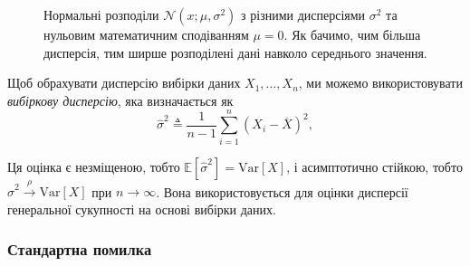 \documentclass{exam_template}
\begin{document}
\begin{figure}[H]
\centering
{}
\caption{Нормальні розподіли $\mathcal{N}(x;\mu,\sigma^2)$ з різними дисперсіями
$\sigma^2$ та нульовим математичним сподіванням $\mu=0$. Як бачимо, чим більша 
дисперсія, тим ширше розподілені дані навколо середнього значення.}
\label{fig:normal_distributions}
\end{figure}

Щоб обрахувати дисперсію вибірки даних $X_1,\dots, X_n$, ми можемо
використовувати \textit{вибіркову дисперсію}, яка визначається як
\begin{equation*}
    \widehat{\sigma}^2 \triangleq \frac{1}{n-1} \sum_{i=1}^n (X_i - \overline{X})^2,
\end{equation*}

Ця оцінка є незміщеною, тобто $\mathbb{E}[\widehat{\sigma}^2] =
\text{Var}[X]$, і асимптотично стійкою, тобто $\widehat{\sigma}^2
\xrightarrow{\rho} \text{Var}[X]$ при $n \to \infty$. Вона використовується
для оцінки дисперсії генеральної сукупності на основі вибірки даних.

\subsubsection{Стандартна помилка}\label{sec:standard_error}
\end{document}
